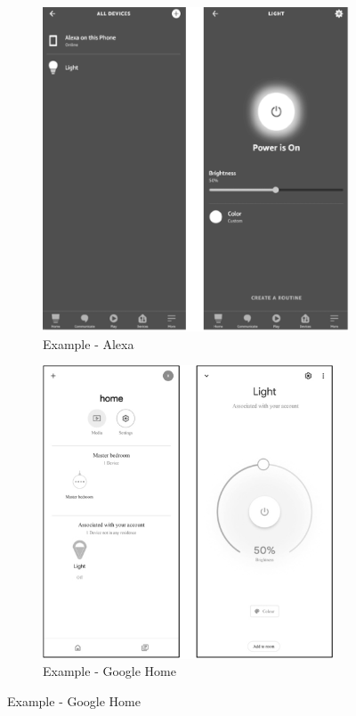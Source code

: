 \documentclass[a4paper,12pt,openany]{book}
\begin{document}
\newpage
\begin{figure}[h!]
\Centering
\begin{subfigure}{0.45\textwidth}
\includegraphics[width=\textwidth]{D3Z/3-4-a} 
\caption{Example - Alexa}
\end{subfigure}\hspace{1em}
\begin{subfigure}{0.5\textwidth}
\includegraphics[width=0.95\textwidth]{D3Z/3-4-b}
\caption{Example - Google Home}
\end{subfigure}


\end{figure}
\end{document}
